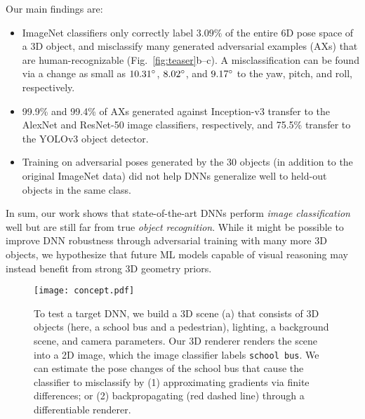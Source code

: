 \documentclass[10pt,twocolumn,letterpaper]{article}
\newcommand{\class}[1]{{\small\texttt{#1}}}
\begin{document}
Our main findings are:

\begin{itemize}
    \item ImageNet classifiers only correctly label $3.09\%$ of the entire 6D pose space of a 3D object, and misclassify many generated adversarial examples (AXs) that are human-recognizable (Fig.~\ref{fig:teaser}b--c).
    A misclassification can be found via a change as small as $10.31\degree$, $8.02\degree$, and $9.17\degree$ to the yaw, pitch, and roll, respectively.
    \item 99.9\% and 99.4\% of AXs generated against Inception-v3 transfer to the AlexNet and ResNet-50 image classifiers, respectively, and 75.5\% transfer to the YOLOv3 object detector.

    \item Training on adversarial poses generated by the 30 objects (in addition to the original ImageNet data) did not help DNNs generalize well to held-out objects in the same class.
\end{itemize}

In sum, our work shows that state-of-the-art DNNs perform \emph{image classification} well but are still far from true \emph{object recognition}.
While it might be possible to improve DNN robustness through adversarial training with many more 3D objects, we hypothesize that future ML models capable of visual reasoning may instead benefit from strong 3D geometry priors.

\begin{figure*}[t]
    \centering
    \texttt{[image: concept.pdf]}
    \caption{To test a target DNN, we build a 3D scene (a) that consists of 3D objects (here, a school bus and a pedestrian), lighting, a background scene, and camera parameters.
    Our 3D renderer renders the scene into a 2D image, which the image classifier labels \class{school bus}.
    We can estimate the pose changes of the school bus that cause the classifier to misclassify by (1) approximating gradients via finite differences; or (2) backpropagating (\textcolor{red_dashed_line}{red} dashed line) through a differentiable renderer.
    }\label{fig:concept}
\end{figure*}
\end{document}
